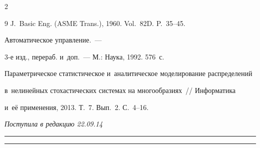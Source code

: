 \begin{multicols}{2}
{{\begin{thebibliography}{9}
J.~Basic Eng. (ASME Trans.), 1960. Vol.~82D. P.~35--45.




 Автоматическое управление.~---

3-е изд., перераб. и~доп.~--- М.: Наука, 1992. 576~с.





Параметрическое статистическое и~аналитическое моделирование распределений

в~нелинейных стохастических системах на многообразиях~// Информатика

и~её применения, 2013. Т.~7. Вып.~2. С.~4--16.

 \end{thebibliography}



 }

 }



\end{multicols}



\vspace*{-3pt}



\hfill{\small\textit{Поступила в редакцию 22.09.14}}






\vspace*{12pt}



\hrule



\vspace*{2pt}



\hrule






\def\tit{STABLE LINEAR CONDITIONALLY OPTIMAL

FILTERS AND~EXTRAPOLATORS FOR~STOCHASTIC SYSTEMS

WITH~MULTIPLICATIVE NOISES}



\def\titkol{Stable linear conditionally optimal

filters and~extrapolators for~stochastic systems

with~multiplicative noises}



